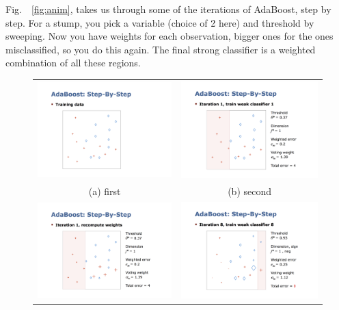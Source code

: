 \documentclass[a4paper]{article}
\begin{document}
Fig.\ ~\ref{fig:anim}, takes us through some of the iterations of AdaBoost, step by step.  For a stump, you pick a variable (choice of 2 here) and threshold by sweeping. Now you have weights for each observation, bigger ones for the ones misclassified, so you do this again.  The final strong classifier is a weighted combination of all these regions.

\begin{figure}
\begin{tabular}{cc}
  \includegraphics[width=65mm]{adaboost1.png} &   \includegraphics[width=65mm]{adaboost2.png} \\
(a) first & (b) second \\[6pt]
 \includegraphics[width=65mm]{adaboost3.png} &   \includegraphics[width=65mm]{adaboost4.png} \\

\end{tabular}
\end{figure}
\end{document}
